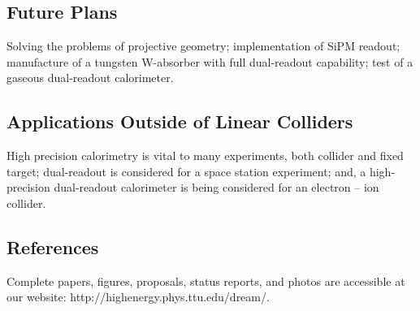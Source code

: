 \subsection{Future Plans}
Solving the problems of projective geometry; implementation of SiPM readout; manufacture of a tungsten W-absorber with full dual-readout capability; test of a gaseous dual-readout calorimeter.
\subsection{Applications Outside of Linear Colliders}
High precision calorimetry is vital to many experiments, both collider and fixed target; dual-readout is considered for a space station experiment; and, a high-precision dual-readout calorimeter is being considered for an electron -- ion collider.
\subsection{References}
Complete papers, figures, proposals, status reports, and photos are accessible at our website: http://highenergy.phys.ttu.edu/dream/.
